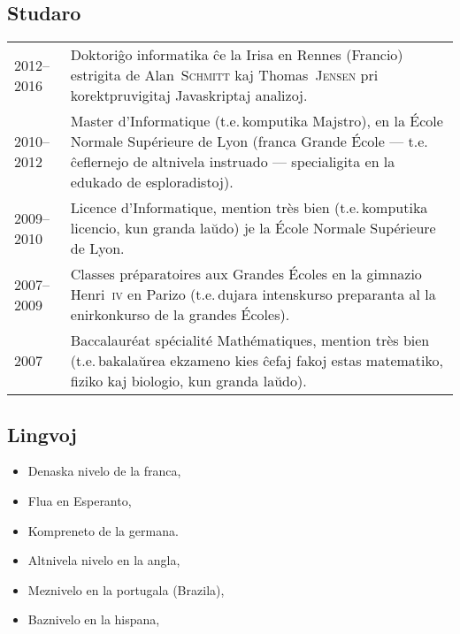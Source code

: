 \documentclass[12pt,a4paper]{article}
\makeatletter
\newcommand{\fr}[1]{\foreignlanguage{french}{{#1}}}
\newcommand{\fr}[1]{\foreignlanguage{french}{{#1}}}
\newcommand{\ie}{t.e.\,}
\newenvironment{datecvsection}[1]%
               {\subsection*{#1}%
                 \noindent \begin{tabular}{@{}p{\annee}p{\texte}@{}}}
               {\end{tabular}}
\newenvironment{cvsection}[1]%
               {\subsection*{#1}}
               {}
\newcommand\familyName{\textsc}
\newcommand\placeName{}
\makeatother
\begin{document}
\begin{datecvsection}{Studaro}

    2012–2016 & Doktoriĝo informatika ĉe la \placeName{Irisa} en \placeName{Rennes} (\placeName{Francio}) estrigita de Alan~\familyName{Schmitt} kaj Thomas~\familyName{Jensen} pri korektpruvigitaj {Javaskript}aj analizoj. \\

    2010–2012 & \fr{Master d’Informatique} (\ie komputika Majstro), en la \fr{\placeName{École Normale Supérieure de Lyon}} (franca \fr{Grande École} — \ie ĉeflernejo de altnivela instruado — specialigita en la edukado de esploradistoj). \\

    2009–2010 & \fr{Licence d’Informatique, mention très bien} (\ie komputika licencio, kun granda laŭdo) je la \fr{\placeName{École Normale Supérieure de Lyon}}. \\

    2007–2009 & \fr{Classes préparatoires aux Grandes Écoles} en la gimnazio \placeName{Henri~\textsc{iv}} en \placeName{Parizo} (\ie dujara intenskurso preparanta al la enirkonkurso de la \fr{grandes Écoles}). \\

    2007 & \fr{Baccalauréat spécialité Mathématiques, mention très bien} (\ie bakalaŭrea ekzameno kies ĉefaj fakoj estas matematiko, fiziko kaj biologio, kun granda laŭdo). \\

\end{datecvsection}

\begin{cvsection}{Lingvoj}
\parbox{.4\textwidth}{
\begin{itemize}
   \item Denaska nivelo de la franca,
   \item Flua en Esperanto,
   \item Kompreneto de la germana.
\end{itemize}}
\parbox{.55\textwidth}{
\begin{itemize}
   \item Altnivela nivelo en la angla,
	 \item Meznivelo en la portugala (Brazila),
   \item Baznivelo en la hispana,
\end{itemize}}
\end{cvsection}
\end{document}
